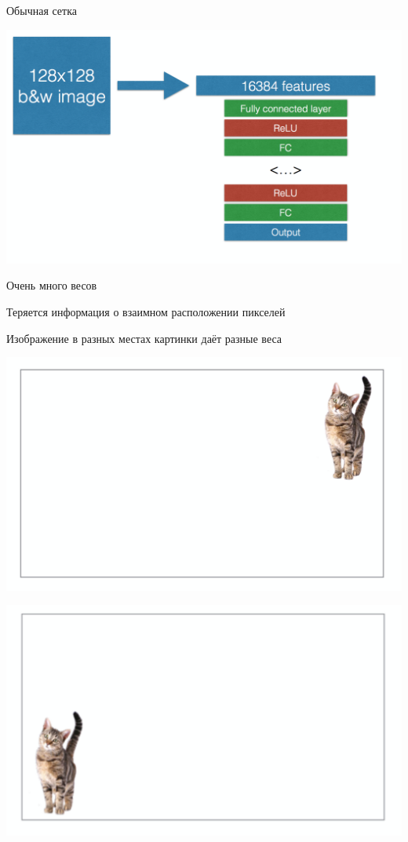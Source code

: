 \documentclass[notes,12pt, aspectratio=169]{beamer}
\newenvironment{wideitemize}{\itemize\addtolength{\itemsep}{10pt}}{\enditemize}
\begin{document}


\begin{frame}{Обычная сетка}
\begin{center}
	\includegraphics[width=.55\linewidth]{not_conv.png}
\end{center}

\begin{wideitemize}
	\item Очень много весов 
	\item Теряется информация о взаимном расположении пикселей
	\item Изображение в разных местах картинки даёт разные веса
\end{wideitemize}
\end{frame}


\begin{frame}
\begin{center}
	\includegraphics[width=.8\linewidth]{cat_1.png}
\end{center}
\end{frame}


\begin{frame}
\begin{center}
	\includegraphics[width=.8\linewidth]{cat_2.png}
\end{center}
\end{frame}
\end{document}
